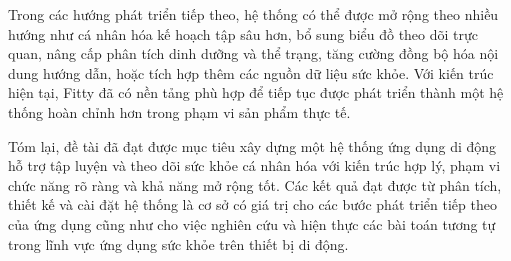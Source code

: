 Trong các hướng phát triển tiếp theo, hệ thống có thể được mở rộng theo nhiều hướng như cá nhân hóa kế hoạch tập sâu hơn, bổ sung biểu đồ theo dõi trực quan, nâng cấp phân tích dinh dưỡng và thể trạng, tăng cường đồng bộ hóa nội dung hướng dẫn, hoặc tích hợp thêm các nguồn dữ liệu sức khỏe. Với kiến trúc hiện tại, Fitty đã có nền tảng phù hợp để tiếp tục được phát triển thành một hệ thống hoàn chỉnh hơn trong phạm vi sản phẩm thực tế.

Tóm lại, đề tài đã đạt được mục tiêu xây dựng một hệ thống ứng dụng di động hỗ trợ tập luyện và theo dõi sức khỏe cá nhân hóa với kiến trúc hợp lý, phạm vi chức năng rõ ràng và khả năng mở rộng tốt. Các kết quả đạt được từ phân tích, thiết kế và cài đặt hệ thống là cơ sở có giá trị cho các bước phát triển tiếp theo của ứng dụng cũng như cho việc nghiên cứu và hiện thực các bài toán tương tự trong lĩnh vực ứng dụng sức khỏe trên thiết bị di động.
